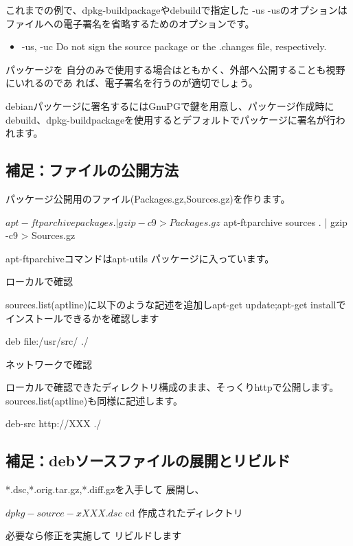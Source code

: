 \documentclass[mingoth,a4paper]{jsarticle}
\begin{document}
これまでの例で、dpkg-buildpackageやdebuildで指定した -us -usのオプションは
ファイルへの電子署名を省略するためのオプションです。
\begin{itemize}
 \item  -us, -uc
 Do not sign the source package or the .changes file, respectively.
\end{itemize}
パッケージを
自分のみで使用する場合はともかく、外部へ公開することも視野にいれるのであ
れば、電子署名を行うのが適切でしょう。

debianパッケージに署名するにはGnuPGで鍵を用意し、パッケージ作成時にdebuild、dpkg-buildpackageを使用するとデフォルトでパッケージに署名が行われます。


\subsection{補足：ファイルの公開方法}

パッケージ公開用のファイル(Packages.gz,Sources.gz)を作ります。
\begin{commandline}
 $ apt-ftparchive packages . | gzip -c9 > Packages.gz
 $ apt-ftparchive sources . | gzip -c9 > Sources.gz
\end{commandline}

apt-ftparchiveコマンドはapt-utils パッケージに入っています。

ローカルで確認

sources.list(aptline)に以下のような記述を追加しapt-get update;apt-get installでインストールできるかを確認します
\begin{commandline}
 deb file:/usr/src/ ./
\end{commandline}

ネットワークで確認

ローカルで確認できたディレクトリ構成のまま、そっくりhttpで公開します。sources.list(aptline)も同様に記述します。
\begin{commandline}
 deb-src http://XXX ./
\end{commandline}

\subsection{補足：debソースファイルの展開とリビルド}

*.dsc,*.orig.tar.gz,*.diff.gzを入手して
展開し、

\begin{commandline}
 $ dpkg-source -x XXX.dsc
 $ cd 作成されたディレクトリ
\end{commandline}
必要なら修正を実施して
リビルドします
\end{document}
